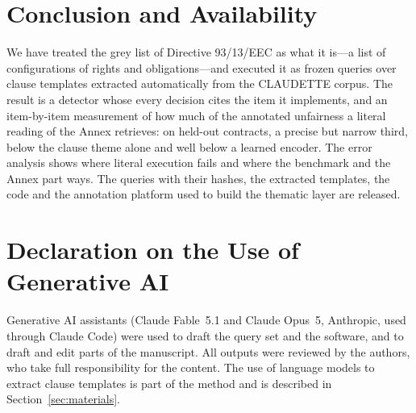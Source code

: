 \documentclass{IOS-Book-Article}
\newcommand{\corpus}{CLAUDETTE}
\begin{document}
\section{Conclusion and Availability}
\label{sec:conclusion}
We have treated the grey list of Directive 93/13/EEC as what it is---a list of configurations of rights and obligations---and executed it as frozen queries over clause templates extracted automatically from the \corpus{} corpus. The result is a detector whose every decision cites the item it implements, and an item-by-item measurement of how much of the annotated unfairness a literal reading of the Annex retrieves: on held-out contracts, a precise but narrow third, below the clause theme alone and well below a learned encoder. The error analysis shows where literal execution fails and where the benchmark and the Annex part ways. The queries with their hashes, the extracted templates, the code and the annotation platform used to build the thematic layer are released.

\section*{Declaration on the Use of Generative AI}
Generative AI assistants (Claude Fable~5.1 and Claude Opus~5, Anthropic, used through Claude Code) were used to draft the query set and the software, and to draft and edit parts of the manuscript. All outputs were reviewed by the authors, who take full responsibility for the content. The use of language models to extract clause templates is part of the method and is described in Section~\ref{sec:materials}.



\end{document}
